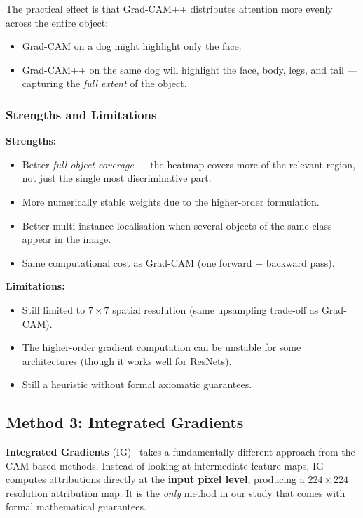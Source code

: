\documentclass[12pt, a4paper]{article}
\begin{document}
The practical effect is that Grad-CAM++ distributes attention more evenly
across the entire object:
\begin{itemize}[leftmargin=*]
    \item Grad-CAM on a dog might highlight only the face.
    \item Grad-CAM++ on the same dog will highlight the face, body, legs, and
          tail --- capturing the \emph{full extent} of the object.
\end{itemize}

\subsubsection{Strengths and Limitations}

\textbf{Strengths:}
\begin{itemize}[leftmargin=*]
    \item Better \emph{full object coverage} --- the heatmap covers more of the
          relevant region, not just the single most discriminative part.
    \item More numerically stable weights due to the higher-order formulation.
    \item Better multi-instance localisation when several objects of the same
          class appear in the image.
    \item Same computational cost as Grad-CAM (one forward + backward pass).
\end{itemize}

\textbf{Limitations:}
\begin{itemize}[leftmargin=*]
    \item Still limited to $7 \times 7$ spatial resolution (same upsampling
          trade-off as Grad-CAM).
    \item The higher-order gradient computation can be unstable for some
          architectures (though it works well for ResNets).
    \item Still a heuristic without formal axiomatic guarantees.
\end{itemize}


\subsection{Method 3: Integrated Gradients}

\textbf{Integrated Gradients} (IG)~\cite{sundararajan2017ig} takes a
fundamentally different approach from the CAM-based methods.  Instead of
looking at intermediate feature maps, IG computes attributions directly at the
\textbf{input pixel level}, producing a $224 \times 224$ resolution attribution
map.  It is the \emph{only} method in our study that comes with formal
mathematical guarantees.
\end{document}
